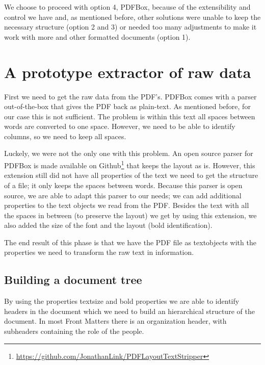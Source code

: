 \documentclass{ou-report}
\begin{document}
We choose to proceed with option 4, PDFBox, because of the extensibility and
control we have
and, as mentioned before, other solutions were unable to keep the necessary
structure (option 2 and 3) or needed too many adjustments to make it work with
more and other formatted documents (option 1).
\section{A prototype extractor of raw data}
First we need to get the raw data from the PDF's. PDFBox comes with a parser 
out-of-the-box that gives the PDF back as plain-text. As mentioned  before, for
our case this is not sufficient. The problem is within this text all spaces
between words are converted to one space. However, we need to be able to 
identify columns, so we need to keep all spaces.

Luckely, we were not the only one with this problem. 
An open source parser for PDFBox is made available on
Github\footnote{\url{https://github.com/JonathanLink/PDFLayoutTextStripper}} 
that keeps the layout as is. However, this extension still did not have all
properties of the text we need to get the structure of a file; it only keeps the
spaces between words. 
Because this parser is open source, we are able to adapt this parser to our 
needs; we can add additional properties to the text objects we read from the 
PDF. Besides the text with all the spaces in between (to preserve the layout) we
get by using this extension, we also added the size of the font and the layout
(bold identification).

The end result of this phase is that we have the PDF file as textobjects with 
the properties we need to transform the raw text in information.

\subsection{Building a document tree}
\label{sec:lncs_parser_doc_tree}
By using the properties textsize and bold properties we are able to identify
headers in the document which we need to build an hierarchical structure of the
document. In 
most Front Matters there is an organization header, with subheaders containing 
the role of the people.
\end{document}
